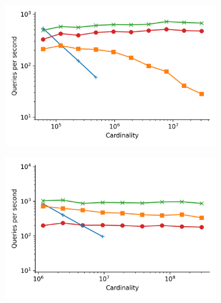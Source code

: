 \documentclass[review,supplement,onefignum,onetabnum]{siamonline220329}
\begin{document}
\begin{figure}
    \begin{subfigure}[b]{0.47\textwidth}
        \includegraphics[width=1.0\textwidth]{plots/fashion-mnist_PermutedBall_100_throughput.png}
        \label{fig:supplement:fashion-mnist-scaling}
    \end{subfigure}%
    \begin{subfigure}[b]{0.47\textwidth}
        \includegraphics[width=1.0\textwidth]{plots/glove-25_PermutedBall_100_throughput.png}
        \label{fig:supplement:glove-25-scaling}
    \end{subfigure}%
    \\
    \begin{subfigure}[b]{0.47\textwidth}

\end{subfigure}
\end{figure}
\end{document}

